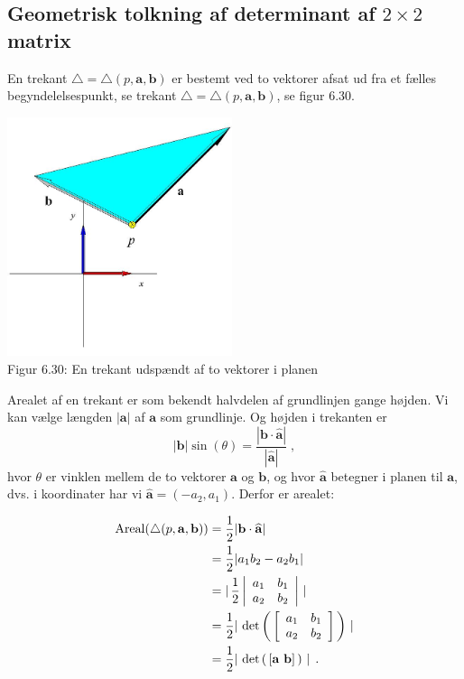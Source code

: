 \subsection{Geometrisk tolkning af determinant af $2\times 2$ matrix}
En trekant $\bigtriangleup = \bigtriangleup(p, \mathbf{a}, \mathbf{b})$ er bestemt ved to vektorer afsat ud fra et fælles begyndelelsespunkt, se trekant $\bigtriangleup = \bigtriangleup(p, \mathbf{a}, \mathbf{b})$, se figur 6.30.
\begin{center}
\includegraphics[height=70mm]{geometer/paborient.jpg}	
	\\Figur 6.30: En trekant udspændt af to vektorer i planen
\end{center}
Arealet af en trekant er som bekendt halvdelen af grundlinjen gange højden. Vi kan vælge længden $|\mathbf{a}|$ af $\mathbf{a}$ som grundlinje. Og højden i trekanten er
\begin{equation}
|\mathbf{b} | \sin(\theta) = \frac {|\mathbf{b} \cdot \widehat{\mathbf{a}}|} {| \widehat{\mathbf{a}}|}  \;,
\end{equation}
hvor $\theta$ er vinklen mellem de to vektorer $\mathbf{a}$ og $\mathbf{b}$, og hvor $\widehat{\mathbf{a}}$ betegner  i planen til $\mathbf{a}$, dvs. i koordinater har vi $\widehat{\mathbf{a}} = (-a_{2}, a_{1})$. Derfor er arealet:

\begin{equation} \label{tn6.eqAreaCalc}
\begin{aligned}
\operatorname{Areal}(\bigtriangleup(p, \mathbf{a}, \mathbf{b})) &= \frac{1}{2}|\mathbf{b} \cdot \widehat{\mathbf{a}}| \\
&= \frac{1}{2}|a_{1}b_{2} - a_{2}b_{1}| \\ &=
| \, \frac{1}{2}\left| \begin{array}{rr}
      a_{1} & b_{1} \\
      a_{2} & b_{2}
          \end{array}
 \right| \, | \\
&=  \frac{1}{2}|\,\det\left(\, \left[ \begin{array}{rr}
      a_{1} & b_{1} \\
      a_{2} & b_{2}
          \end{array} \right]\,\right)\, | \\
&=
\frac{1}{2}|\,\det\left(\, \left[ \mathbf{a}\,\,\mathbf{b} \right]\,\right)\, |\, \;.
\end{aligned}
\end{equation}

